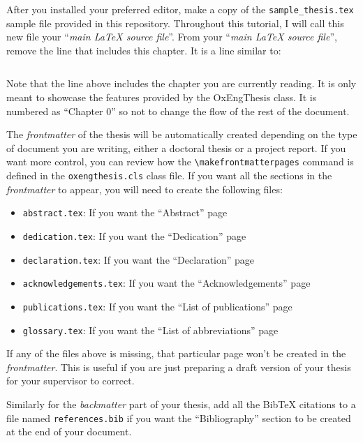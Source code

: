 After you installed your preferred \latex editor, make a copy of the \verb|sample_thesis.tex| sample file provided in this repository. Throughout this tutorial, I will call this new file your ``\textit{main LaTeX source file}''. From your ``\textit{main LaTeX source file}'', remove the line that includes this chapter. It is a line similar to:


\begin{lstlisting}[style=custom-latex]

\end{lstlisting}


Note that the line above includes the chapter you are currently reading. It is only meant to showcase the features provided by the OxEngThesis class. It is numbered as ``Chapter 0'' so not to change the flow of the rest of the document.

The \textit{frontmatter} of the thesis will be automatically created depending on the type of document you are writing, either a doctoral thesis or a project report. If you want more control, you can review how the \verb|\makefrontmatterpages| command is defined in the \verb|oxengthesis.cls| class file. If you want all the sections in the \textit{frontmatter} to appear, you will need to create the following files:


\begin{itemize}
    \item \verb|abstract.tex|: If you want the ``Abstract'' page
    \item \verb|dedication.tex|: If you want the ``Dedication'' page
    \item \verb|declaration.tex|: If you want the ``Declaration'' page
    \item \verb|acknowledgements.tex|: If you want the ``Acknowledgements'' page
    \item \verb|publications.tex|: If you want the ``List of publications'' page
    \item \verb|glossary.tex|: If you want the ``List of abbreviations'' page
\end{itemize}


If any of the files above is missing, that particular page won't be created in the \textit{frontmatter}. This is useful if you are just preparing a draft version of your thesis for your supervisor to correct. 

Similarly for the \textit{backmatter} part of your thesis, add all the BibTeX citations to a file named \verb|references.bib| if you want the ``Bibliography'' section to be created at the end of your document. 


